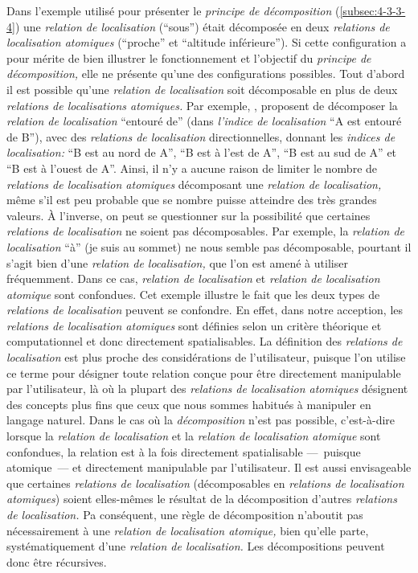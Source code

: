 Dans l'exemple utilisé pour présenter le \emph{principe de
  décomposition} (\autoref{subsec:4-3-3-4}) une \emph{relation de
  localisation} (\enquote{sous}) était décomposée en deux
\emph{relations de localisation atomiques} (\enquote{proche} et
\enquote{altitude inférieure}). Si cette configuration a pour mérite
de bien illustrer le fonctionnement et l'objectif du \emph{principe de
  décomposition,} elle ne présente qu'une des configurations
possibles. Tout d'abord il est possible qu'une \emph{relation de
  localisation} soit décomposable en plus de deux \emph{relations de
  localisations atomiques.} Par exemple, \textcite{Vanegas2011},
proposent de décomposer la \emph{relation de localisation}
\enquote{entouré de} (dans \emph{l'indice de localisation} \enquote{A
  est entouré de B}), avec des \emph{relations de localisation}
directionnelles, donnant les \emph{indices de localisation:}
\enquote{B est au nord de A}, \enquote{B est à l'est de A}, \enquote{B
  est au sud de A} et \enquote{B est à l'ouest de A}. Ainsi, il n'y a
aucune raison de limiter le nombre de \emph{relations de localisation
  atomiques} décomposant une \emph{relation de localisation,} même
s'il est peu probable que se nombre puisse atteindre des très grandes
valeurs. À l'inverse, on peut se questionner sur la possibilité que
certaines \emph{relations de localisation} ne soient pas
décomposables. Par exemple, la \emph{relation de localisation}
\enquote{à} (\eg je suis au sommet) ne nous semble pas décomposable,
pourtant il s'agit bien d'une \emph{relation de localisation,} que
l'on est amené à utiliser fréquemment. Dans ce cas, \emph{relation de
  localisation} et \emph{relation de localisation atomique} sont
confondues. Cet exemple illustre le fait que les deux types de
\emph{relations de localisation} peuvent se confondre. En effet, dans
notre acception, les \emph{relations de localisation atomiques} sont
définies selon un critère théorique et computationnel et donc
directement spatialisables. La définition des \emph{relations de
  localisation} est plus proche des considérations de l'utilisateur,
puisque l'on utilise ce terme pour désigner toute relation conçue pour
être directement manipulable par l'utilisateur, là où la plupart des
\emph{relations de localisation atomiques} désignent des concepts plus
fins que ceux que nous sommes habitués à manipuler en langage
naturel. Dans le cas où la \emph{décomposition} n'est pas possible,
c'est-à-dire lorsque la \emph{relation de localisation} et la
\emph{relation de localisation atomique} sont confondues, la relation
est à la fois directement spatialisable ---~puisque atomique~--- et
directement manipulable par l'utilisateur. Il est aussi envisageable
que certaines \emph{relations de localisation} (décomposables en
\emph{relations de localisation atomiques}) soient elles-mêmes le
résultat de la décomposition d'autres \emph{relations de
  localisation.} Pa conséquent, une règle de décomposition n’aboutit
pas nécessairement à une \emph{relation de localisation atomique,}
bien qu'elle parte, systématiquement d'une \emph{relation de
  localisation.} Les décompositions peuvent donc être récursives.

